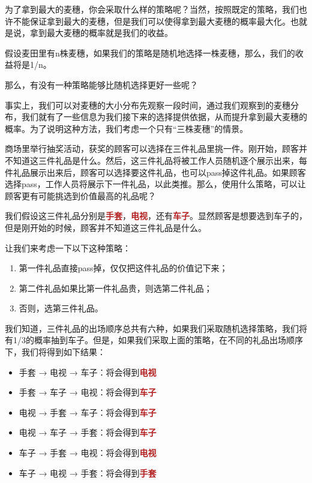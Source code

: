 \documentclass[export, 12pt, letterpaper]{ctexrep}
\newenvironment{shadedquotation}
 {\begin{shaded*}
  \quoting[leftmargin=5pt, rightmargin=5pt, vskip=0pt]
 }
 {\endquoting
 \end{shaded*}
}
\begin{document}
为了拿到最大的麦穗，你会采取什么样的策略呢？当然，按照既定的策略，我们也许不能保证拿到最大的麦穗，但是我们可以使得拿到最大麦穗的概率最大化。也就是说，拿到最大麦穗的概率就是我们的收益。

假设麦田里有n株麦穗，如果我们的策略是随机地选择一株麦穗，那么，我们的收益将是1/n。

那么，有没有一种策略能够比随机选择更好一些呢？

事实上，我们可以对麦穗的大小分布先观察一段时间，通过我们观察到的麦穗分布，我们就有了一些信息为我们接下来的选择提供依据，从而提升拿到最大麦穗的概率。为了说明这种方法，我们考虑一个只有“三株麦穗”的情景。

\begin{shadedquotation}
\noindent
商场里举行抽奖活动，获奖的顾客可以选择在三件礼品里挑一件。刚开始，顾客并不知道这三件礼品是什么。然后，这三件礼品将被工作人员随机逐个展示出来，每件礼品展示出来后，顾客可以选择要这件礼品，也可以pass掉这件礼品。如果顾客选择pass，工作人员将展示下一件礼品，以此类推。那么，使用什么策略，可以让顾客更有可能挑选到价值最高的礼品呢？
\end{shadedquotation}


我们假设这三件礼品分别是\textbf{\textcolor{Firebrick}{手套}}，\textbf{\textcolor{Firebrick}{电视}}，还有\textbf{\textcolor{Firebrick}{车子}}。显然顾客是想要选到车子的，但是刚开始的时候，顾客并不知道这三件礼品是什么。

让我们来考虑一下以下这种策略：

\begin{enumerate}
\item{ 第一件礼品直接pass掉，仅仅把这件礼品的价值记下来； }
\item{ 第二件礼品如果比第一件礼品贵，则选第二件礼品； }
\item{ 否则，选第三件礼品。 }
\end{enumerate}


我们知道，三件礼品的出场顺序总共有六种，如果我们采取随机选择策略，我们将有1/3的概率抽到车子。但是，如果我们采取上面的策略，在不同的礼品出场顺序下，我们将得到如下结果：


\begin{itemize}
\item{ 手套 → 电视 → 车子：将会得到\textbf{\textcolor{Firebrick}{电视}} }
\item{ 手套 → 车子 → 电视：将会得到\textbf{\textcolor{Firebrick}{车子}} }
\item{ 电视 → 手套 → 车子：将会得到\textbf{\textcolor{Firebrick}{车子}} }
\item{ 电视 → 车子 → 手套：将会得到\textbf{\textcolor{Firebrick}{车子}} }
\item{ 车子 → 手套 → 电视：将会得到\textbf{\textcolor{Firebrick}{电视}} }
\item{ 车子 → 电视 → 手套：将会得到\textbf{\textcolor{Firebrick}{手套}} }
\end{itemize}
\end{document}
